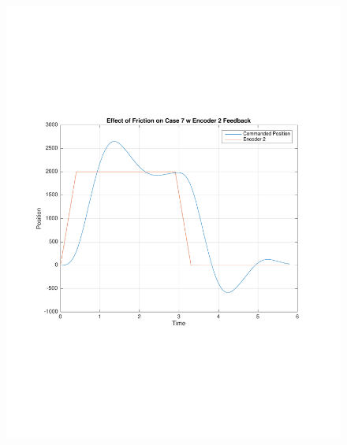 \documentclass[11pt, a4paper]{article}
\begin{document}
\begin{figure}[H]
\centering
\includegraphics[width = \textwidth]{8_tc7_fric.pdf}
\end{figure}
\end{document}
